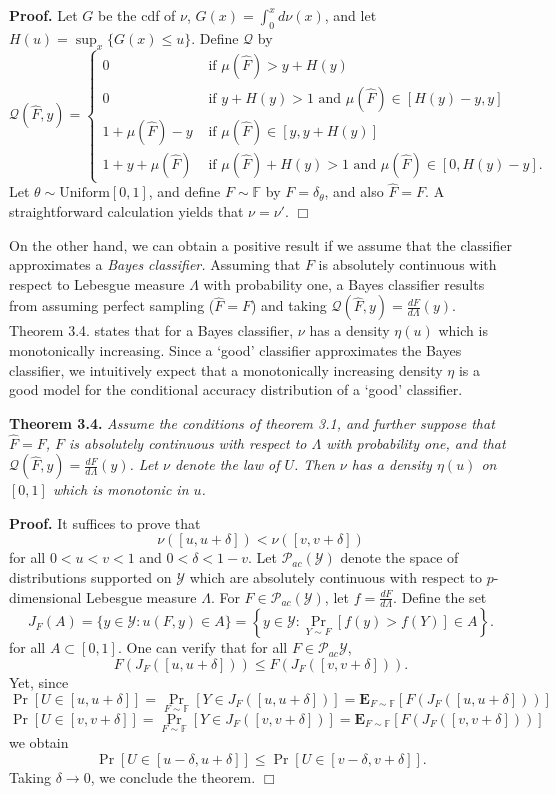 \documentclass{article}
\newcommand{\E}{\textbf{E}}
\begin{document}
\textbf{Proof.}  
Let $G$ be the cdf of $\nu$, $G(x) = \int_0^x d\nu(x)$, and let $H(u) = \sup_x \{G(x) \leq u\}$.
Define $\mathcal{Q}$ by
\[
\mathcal{Q}(\hat{F}, y) = \begin{cases}
0 &\text{ if }\mu(\hat{F}) > y + H(y)\\
0 & \text{ if }y + H(y) > 1 \text{ and }\mu(\hat{F}) \in [H(y) - y, y]\\
1 + \mu(\hat{F}) - y &\text{ if } \mu(\hat{F}) \in [y, y + H(y)]\\
1 + y + \mu(\hat{F}) &\text{ if }\mu(\hat{F}) + H(y) > 1 \text{ and }\mu(\hat{F}) \in [0, H(y) - y]. 
\end{cases}
\]
Let $\theta \sim \text{Uniform}[0,1]$,
and define $F \sim \mathbb{F}$ by $F = \delta_\theta$, and also $\hat{F} = F.$
A straightforward calculation yields that $\nu = \nu'$. $\Box$

On the other hand, we can obtain a positive result if we assume that
the classifier approximates a \emph{Bayes classifier.}
Assuming that $F$ is absolutely continuous with respect to Lebesgue measure $\Lambda$ with probability one,
a Bayes classifier results from assuming perfect sampling ($\hat{F} = F$) and taking
$\mathcal{Q}(\hat{F}, y) = \frac{dF}{d\Lambda}(y)$.
Theorem 3.4. states that for a Bayes classifier, $\nu$ has a density $\eta(u)$ which is monotonically increasing.
Since a `good' classifier approximates the Bayes classifier, we intuitively expect that a monotonically
increasing density $\eta$ is a good model for the conditional accuracy distribution of a `good' classifier.

\noindent\textbf{Theorem 3.4.} \emph{ Assume the conditions of theorem 3.1, and further suppose
that $\hat{F} = F$, $F$ is absolutely continuous with respect to $\Lambda$ with probability one,
and that $\mathcal{Q}(\hat{F}, y) = \frac{dF}{d\Lambda}(y)$.
Let $\nu$ denote the law of $U$.    Then $\nu$ has a density $\eta(u)$ on $[0, 1]$ which is monotonic in $u$.
}

\noindent\textbf{Proof.}
It suffices to prove that
\[
\nu([u, u + \delta]) < \nu([v, v + \delta])
\]
for all $0 < u < v < 1$ and $0 < \delta < 1-v$.
Let $\mathcal{P}_{ac}(\mathcal{Y})$ denote the space of distributions supported on $\mathcal{Y}$ which are
absolutely continuous with respect to $p$-dimensional Lebesgue measure $\Lambda$.
For $F \in \mathcal{P}_{ac}(\mathcal{Y})$, let $f = \frac{dF}{d\Lambda}$. Define the set 
\[
J_F(A) =\{y \in \mathcal{Y}: u(F, y) \in A\} = \left\{y \in \mathcal{Y}: \Pr_{Y \sim F}[f(y) > f(Y)] \in A\right\}.
\]
for all $A \subset [0, 1].$
One can verify that for all $F \in \mathcal{P}_{ac}\mathcal{Y}$,
\[
F(J_F([u, u + \delta])) \leq F(J_F([v, v + \delta])).
\]
Yet, since
\[
\Pr[U \in [u, u + \delta]] = \Pr_{F \sim \mathbb{F}}[Y \in J_F([u, u + \delta])] = \E_{F \sim \mathbb{F}}[F(J_F([u, u + \delta]))]
\]
\[
\Pr[U \in [v, v + \delta]] = \Pr_{F \sim \mathbb{F}}[Y \in J_F([v, v + \delta])] = \E_{F \sim \mathbb{F}}[F(J_F([v, v + \delta]))]
\]
we obtain
\[
\Pr[U \in [u-\delta, u + \delta]] \leq \Pr[U \in [v - \delta, v + \delta]].
\]
Taking $\delta \to 0$, we conclude the theorem. $\Box$\newline
\end{document}
